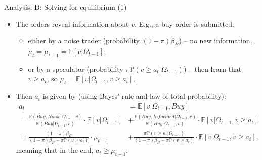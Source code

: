 \documentclass[english,10pt
,aspectratio=169
]{beamer}
\begin{document}
\begin{frame}{Analysis. D: Solving for equilibrium (1)}
	\begin{itemize}
		\item The orders reveal information about $v$. E.g., a \alert{buy order} is submitted:
		\begin{itemize}
			\item either by a noise trader (probability $(1-\pi)\beta_B$) -- no new information, $\mu_t = \mu_{t-1} = \mathbb{E}[v|\Omega_{t-1}]$;
			\item or by a speculator (probability $\pi \mathbb{P}(v \geq a_t | \Omega_{t-1})$) -- then learn that $v \geq a_t$, so $\mu_t = \mathbb{E} [v | \Omega_{t-1}, v \geq a_t]$.
		\end{itemize}
		\item Then $a_t$ is given by (using Bayes' rule and law of total probability):
		\begin{align*}
			a_t &= \mathbb{E}[v|\Omega_{t-1}, Buy]
			\\
			= \frac{\mathbb{P}(Buy,Noise|\Omega_{t-1}, v)}{\mathbb{P}(Buy|\Omega_{t-1}, v)} \cdot \mathbb{E}[v|\Omega_{t-1}] &+ \frac{\mathbb{P}(Buy,Informed|\Omega_{t-1}, v)}{\mathbb{P}(Buy|\Omega_{t-1}, v)} \cdot \mathbb{E} [v | \Omega_{t-1}, v \geq a_t]
			\\
			= \frac{(1-\pi)\beta_B}{(1-\pi) \beta_B + \pi \mathbb{P}(v \geq a_t)} \cdot \mu_{t-1} &+ \frac{\pi \mathbb{P}(v \geq a_t | \Omega_{t-1})}{(1-\pi) \beta_B + \pi \mathbb{P}(v \geq a_t)} \cdot \mathbb{E} [v | \Omega_{t-1}, v \geq a_t],
		\end{align*}
		meaning that in the end, $a_t \geq \mu_{t-1}$.
	\end{itemize}
\end{frame}
\end{document}
